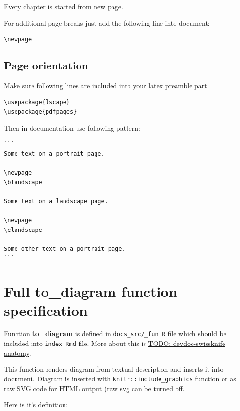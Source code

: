 \documentclass[
  12pt,
  a4paper,
  12pt,
  oneside,
  openany]{book}
\begin{document}
Every chapter is started from new page.

For additional page breaks just add the following line into document:

\begin{verbatim}
\newpage
\end{verbatim}

\hypertarget{usage-pdf-pageOrientation}{%
\subsection{Page orientation}\label{usage-pdf-pageOrientation}}

Make sure following lines are included into your latex preamble part:

\begin{verbatim}
\usepackage{lscape}
\usepackage{pdfpages}
\end{verbatim}

Then in documentation use following pattern:

\begin{verbatim}
```
Some text on a portrait page.

\newpage
\blandscape

Some text on a landscape page.

\newpage
\elandscape

Some other text on a portrait page.
```
\end{verbatim}

\hypertarget{usage-spec}{%
\section{\texorpdfstring{Full \textbf{to\_diagram} function specification}{Full to\_diagram function specification}}\label{usage-spec}}

Function \textbf{to\_diagram} is defined in \texttt{docs\_src/\_fun.R} file which should be included into \texttt{index.Rmd} file. More about this is \protect\hyperlink{anatomy}{TODO: devdoc-swissknife anatomy}.

This function renders diagram from textual description and inserts it into document. Diagram is inserted with \texttt{knitr::include\_graphics} function or as \protect\hyperlink{usage-svg}{raw SVG} code for HTML output (raw svg can be \href{(\#usage-svg-file)\%20via\%20arguments}{turned off}.

Here is it's definition:
\end{document}
